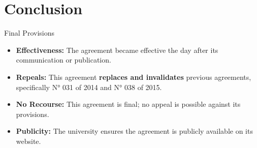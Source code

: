               \section{Conclusion}

              \begin{frame}{Final Provisions}
                \begin{itemize}
                  \item<1-> \textbf{Effectiveness:} The agreement became effective the day after its communication or publication.
                  \item<2-> \textbf{Repeals:} This agreement \textbf{replaces and invalidates} previous agreements, specifically N° 031 of 2014 and N° 038 of 2015.
                  \item<3-> \textbf{No Recourse:} This agreement is final; no appeal is possible against its provisions.
                  \item<4-> \textbf{Publicity:} The university ensures the agreement is publicly available on its website.
                \end{itemize}
              \end{frame}
